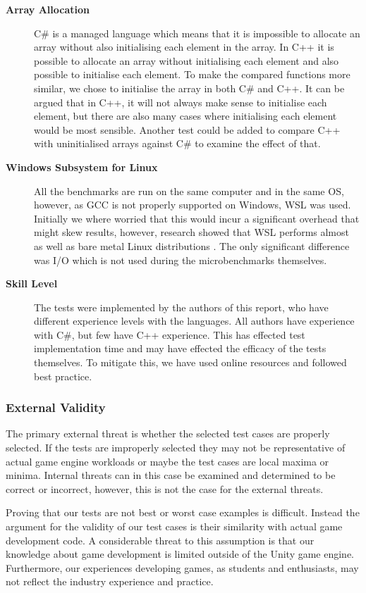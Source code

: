\begin{description}
    \item[\textbf{Array Allocation}]
    C\# is a managed language which means that it is impossible to allocate an array without also initialising each element in the array. In C++ it is possible to allocate an array without initialising each element and also possible to initialise each element. To make the compared functions more similar, we chose to initialise the array in both C\# and C++. It can be argued that in C++, it will not always make sense to initialise each element, but there are also many cases where initialising each element would be most sensible. Another test could be added to compare C++ with uninitialised arrays against C\# to examine the effect of that.
    \item[\textbf{Windows Subsystem for Linux}]
    All the benchmarks are run on the same computer and in the same \ac{OS}, however, as \ac{GCC} is not properly supported on Windows, \ac{WSL} was used. Initially we where worried that this would incur a significant overhead that might skew results, however, research showed that \ac{WSL} performs almost as well as bare metal Linux distributions \cite{phoronix:wslperformance}. The only significant difference was \ac{I/O} which is not used during the microbenchmarks themselves.
    \item[\textbf{Skill Level}]
    The tests were implemented by the authors of this report, who have different experience levels with the languages. All authors have experience with C\#, but few have C++ experience. This has effected test implementation time and may have effected the efficacy of the tests themselves. To mitigate this, we have used online resources and followed best practice.
\end{description}

\subsubsection{External Validity}
The primary external threat is whether the selected test cases are properly selected. If the tests are improperly selected they may not be representative of actual game engine workloads or maybe the test cases are local maxima or minima. Internal threats can in this case be examined and determined to be correct or incorrect, however, this is not the case for the external threats.

Proving that our tests are not best or worst case examples is difficult. Instead the argument for the validity of our test cases is their similarity with actual game development code. A considerable threat to this assumption is that our knowledge about game development is limited outside of the Unity game engine. Furthermore, our experiences developing games, as students and enthusiasts, may not reflect the industry experience and practice.

